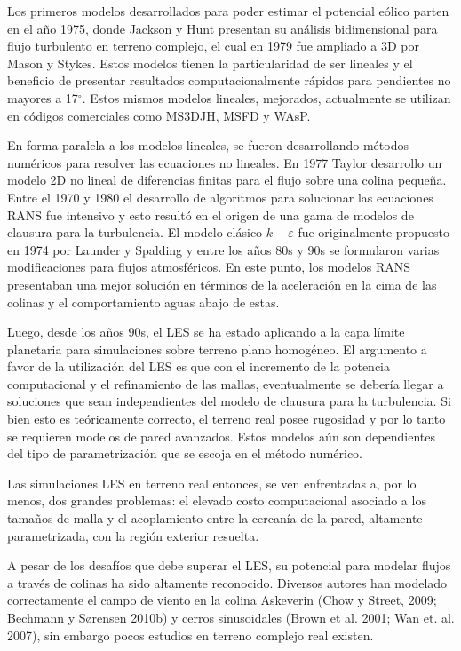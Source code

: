 Los primeros modelos desarrollados para poder estimar el potencial eólico parten en el año 1975, donde Jackson y Hunt presentan su análisis bidimensional para flujo turbulento en terreno complejo, el cual en 1979 fue ampliado a 3D por Mason y Stykes. Estos modelos tienen la particularidad de ser lineales y el beneficio de presentar resultados computacionalmente rápidos para pendientes no mayores a 17$^\circ$. Estos mismos modelos lineales, mejorados, actualmente se utilizan en códigos comerciales como MS3DJH, MSFD y WAsP.

En forma paralela a los modelos lineales, se fueron desarrollando métodos numéricos para resolver las ecuaciones no lineales. En 1977 Taylor desarrollo un modelo 2D no lineal de diferencias finitas para el flujo sobre una colina pequeña. Entre el 1970 y 1980 el desarrollo de algoritmos para solucionar las ecuaciones RANS fue intensivo y esto resultó en el origen de una gama de modelos de clausura para la turbulencia. El modelo clásico $k-\varepsilon$ fue originalmente propuesto en 1974 por Launder y Spalding y entre los años 80s y 90s se formularon varias modificaciones para flujos atmosféricos. En este punto, los modelos RANS presentaban una mejor solución en términos de la aceleración en la cima de las colinas y el comportamiento aguas abajo de estas.

Luego, desde los años 90s, el LES se ha estado aplicando a la capa límite planetaria para simulaciones sobre terreno plano homogéneo. El argumento a favor de la utilización del LES es que con el incremento de la potencia computacional y el refinamiento de las mallas, eventualmente se debería llegar a soluciones que sean independientes del modelo de clausura para la turbulencia. Si bien esto es teóricamente correcto, el terreno real posee rugosidad y por lo tanto se requieren modelos de pared avanzados. Estos modelos aún son dependientes del tipo de parametrización que se escoja en el método numérico.

Las simulaciones LES en terreno real entonces, se ven enfrentadas a, por lo menos, dos grandes problemas: el elevado costo computacional asociado a los tamaños de malla y el acoplamiento entre la cercanía de la pared, altamente parametrizada, con la región exterior resuelta.

A pesar de los desafíos que debe superar el LES, su potencial para modelar flujos a través de colinas ha sido altamente reconocido. Diversos autores han modelado correctamente el campo de viento en la colina Askeverin (Chow y Street, 2009; Bechmann y Sørensen 2010b) y cerros sinusoidales (Brown et al. 2001; Wan et. al. 2007), sin embargo pocos estudios en terreno complejo real existen.
